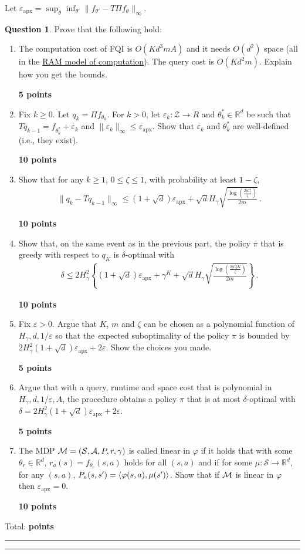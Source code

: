 \documentclass{article}
\newcommand{\norm}[1]{\| #1 \|}
\renewcommand{\epsilon}{\varepsilon}
\renewcommand{\phi}{\varphi}
\newcommand{\R}{\mathbb{R}}
\newcommand{\cZ}{\mathcal{Z}}
\DeclareMathOperator*{\1}{\mathbbm{1}}
\newcommand{\0}{\mathbf{0}}
\newcounter{DocPoints} %
\newcounter{QuestionPoints} %
\newcommand{\points}[1]{%
	\par\mbox{}\par\noindent\hfill {\bf #1 points}%
	\addtocounter{DocPoints}{#1}
	\addtocounter{QuestionPoints}{#1}
}
\newcommand{\tpoints}[1]{        %
	\ifthenelse{\isempty{#1}}%
	{%
	}%
	{%
		\addtocounter{DocPoints}{#1}
		\addtocounter{QuestionPoints}{#1}
	}													 %
	\par\mbox{}\par\noindent\hfill {Total: \bf \arabic{QuestionPoints}\xspace points}\par\mbox{}\par\hrule\hrule
	\setcounter{QuestionPoints}{0}
}
\theoremstyle{definition}
\newtheorem{question}{Question}
\theoremstyle{remark}
\newcommand{\cS}{\mathcal{S}}
\newcommand{\cA}{\mathcal{A}}
\begin{document}
\newcommand{\epx}{\varepsilon_{\textrm{apx}}}
Let $\epx = \sup_{\theta} \inf_{\theta'} \norm{  f_{\theta'} - T \Pi f_{\theta} }_\infty$.
\begin{question}
Prove that the following hold:
\begin{enumerate}
\item The computation cost of FQI is $O(K d^3 m A)$ and it needs $O(d^2)$ space (all in the \href{https://en.wikipedia.org/wiki/Random-access_machine}{RAM model of computation}). The query cost is $O(K d^2 m)$. Explain how you get the bounds.
\points{5}
\item Fix $k\ge 0$. 
Let $q_k = \Pi f_{\theta_k}$. For $k>0$, let $\epsilon_k:\cZ \to R$ and $\theta_k^*\in \R^d$ 
be such that 
$T q_{k-1}= f_{\theta_k^*}+\epsilon_k$ 
and $\norm{\epsilon_k}_\infty \le \epx$. Show that $\epsilon_k$ and $\theta_k^*$ are well-defined (i.e., they exist).
\points{10}
\item Show that for any  $k\ge 1$, $0\le \zeta\le 1$, with probability at least $1-\zeta$,
\begin{align*}
\norm{q_k - T q_{k-1}}_\infty \le (1+\sqrt{d}) \epx + \sqrt{d} H_\gamma \sqrt{\frac{\log\left(\frac{2|C|}{\zeta}\right)}{2m}}\,.
\end{align*}
\points{10}
\item Show that, on the same event as in the previous part, the policy $\pi$ that is greedy with respect to $q_K$ is $\delta$-optimal with 
\begin{align*}
\delta \le 2 H_\gamma^2
\left\{
(1+\sqrt{d}) \epx +
 \gamma^K 
+ \sqrt{d} H_\gamma \sqrt{\frac{\log\left(\frac{2|C| K}{\zeta}\right)}{2m}} \right\}\,.
\end{align*}
\points{10}
\item 
Fix $\epsilon>0$.
Argue that $K$, $m$ and $\zeta$ can be chosen
as a polynomial function of $H_\gamma,d, 1/\epsilon$
so that the {\emph expected} suboptimality of the policy $\pi$ is bounded by
$2H_\gamma^2 (1+\sqrt{d})\epx + 2\epsilon$.  Show the choices you made.
\points{5}
\item Argue that with a query, runtime and space cost that is polynomial in $H_\gamma,d, 1/\epsilon,A$, 
the procedure obtains a policy $\pi$ that is at most $\delta$-optimal with
$\delta=2H_\gamma^2 (1+\sqrt{d})\epx + 2\epsilon$.
\points{5}
\item The MDP $\cM = (\cS,\cA,P,r,\gamma)$ is called linear in $\phi$ if it holds that with some $\theta_r\in \R^d$, $r_a(s) = f_{\theta_r}(s,a)$ holds for all $(s,a)$ and if for some $\mu:\cS \to \R^d$, 
 for any $(s,a)$,
$P_a(s,s') = \ip{\phi(s,a), \mu(s')}$. Show that if $\mathcal{M}$ is linear in $\phi$ then $\epx = 0$.
\points{10}
\end{enumerate}
\tpoints{}
\end{question}
\end{document}
